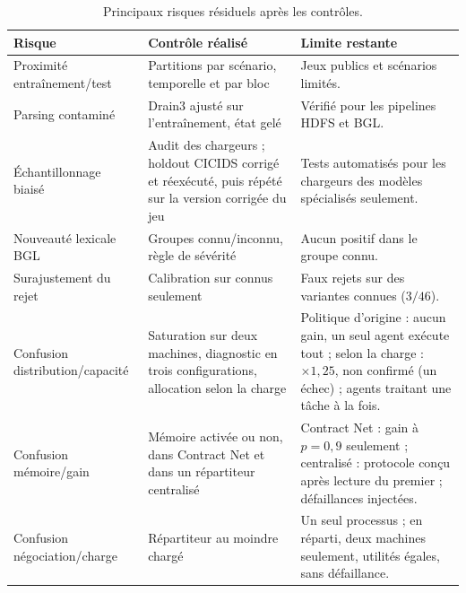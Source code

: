 \begin{table}[H]
\centering
\caption{Principaux risques résiduels après les contrôles.}
\label{tab:risques-validite}
\small
\begin{tabularx}{\textwidth}{p{} p{} X}
\toprule
\textbf{Risque} & \textbf{Contrôle réalisé} & \textbf{Limite restante} \\
\midrule
Proximité entraînement/test & Partitions par scénario, temporelle et par bloc & Jeux publics et scénarios limités. \\
Parsing contaminé & Drain3 ajusté sur l'entraînement, état gelé & Vérifié pour les pipelines HDFS et BGL. \\
Échantillonnage biaisé & Audit des chargeurs ; holdout CICIDS corrigé et réexécuté, puis répété sur la version corrigée du jeu & Tests automatisés pour les chargeurs des modèles spécialisés seulement. \\
Nouveauté lexicale BGL & Groupes connu/inconnu, règle de sévérité & Aucun positif dans le groupe connu. \\
Surajustement du rejet & Calibration sur connus seulement & Faux rejets sur des variantes connues ($3/46$). \\
Confusion distribution/capacité & Saturation sur deux machines, diagnostic en trois configurations, allocation selon la charge & Politique d'origine : aucun gain, un seul agent exécute tout ; selon la charge : $\times 1{,}25$, non confirmé (un échec) ; agents traitant une tâche à la fois. \\
Confusion mémoire/gain & Mémoire activée ou non, dans Contract Net et dans un répartiteur centralisé & Contract Net : gain à $p = 0{,}9$ seulement ; centralisé : protocole conçu après lecture du premier ; défaillances injectées. \\
Confusion négociation/charge & Répartiteur au moindre chargé & Un seul processus ; en réparti, deux machines seulement, utilités égales, sans défaillance. \\
\bottomrule
\end{tabularx}
\end{table}


